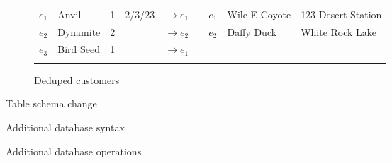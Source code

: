 \documentclass[english,submission]{programming}
\theoremstyle{definition}
\begin{document}
\begin{figure}
\begin{subfigure}[b]{40em}
\begin{tabular}{ r|l|r|r|r|cr|l|l|}
     $e_1$ & Anvil & 1 & 2/3/23 & $\rightarrow\!e_1$ && $e_1$ & Wile E Coyote & 123 Desert Station \\
     \hhline{~----~~--}
     $e_2$ & Dynamite & 2 & & $\rightarrow\!e_2$ && $e_2$ & Daffy Duck & White Rock Lake \\
     \hhline{~----~~--}
     $e_3$ & Bird Seed & 1 & & $\rightarrow\!e_1$ && \multicolumn{3}{l}{}$e_3$\\
     \hhline{~----~~~~}
  \end{tabular}
  \caption{Deduped customers}
  \label{fig:tables-dedup}
\end{subfigure}
\caption{Table schema change}
\label{fig:tables}
\end{figure}
\begin{figure}
  \caption{Additional database syntax}
  \label{fig:db-syntax}
\end{figure}
\begin{figure}
  \caption{Additional database operations}
  \label{fig:db-operations}
\end{figure}
\end{document}
